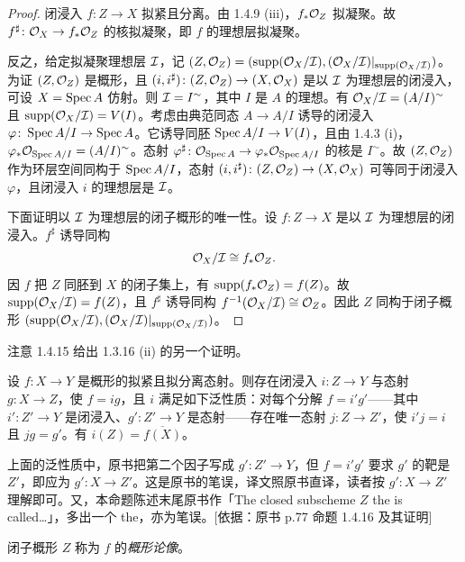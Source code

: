 \begin{proof}
闭浸入 $f\colon Z\to X$ 拟紧且分离。由 1.4.9 (iii)，$f_*\mathcal{O}_Z$ 拟凝聚。故 $f^\sharp\colon\mathcal{O}_X\to f_*\mathcal{O}_Z$ 的核拟凝聚，即 $f$ 的理想层拟凝聚。

反之，给定拟凝聚理想层 $\mathcal{I}$，记 $(Z,\mathcal{O}_Z)=(\operatorname{supp}(\mathcal{O}_X/\mathcal{I}),(\mathcal{O}_X/\mathcal{I})|_{\operatorname{supp}(\mathcal{O}_X/\mathcal{I})})$。为证 $(Z,\mathcal{O}_Z)$ 是概形，且 $(i,i^\sharp)\colon(Z,\mathcal{O}_Z)\to(X,\mathcal{O}_X)$ 是以 $\mathcal{I}$ 为理想层的闭浸入，可设 $X=\operatorname{Spec} A$ 仿射。则 $\mathcal{I}=I^\sim$，其中 $I$ 是 $A$ 的理想。有 $\mathcal{O}_X/\mathcal{I}=(A/I)^\sim$ 且 $\operatorname{supp}(\mathcal{O}_X/\mathcal{I})=V(I)$。考虑由典范同态 $A\to A/I$ 诱导的闭浸入 $\varphi\colon\operatorname{Spec} A/I\to\operatorname{Spec} A$。它诱导同胚 $\operatorname{Spec} A/I\to V(I)$，且由 1.4.3 (i)，$\varphi_*\mathcal{O}_{\operatorname{Spec} A/I}=(A/I)^\sim$。态射 $\varphi^\sharp\colon\mathcal{O}_{\operatorname{Spec} A}\to\varphi_*\mathcal{O}_{\operatorname{Spec} A/I}$ 的核是 $I^\sim$。故 $(Z,\mathcal{O}_Z)$ 作为环层空间同构于 $\operatorname{Spec} A/I$，态射 $(i,i^\sharp)\colon(Z,\mathcal{O}_Z)\to(X,\mathcal{O}_X)$ 可等同于闭浸入 $\varphi$，且闭浸入 $i$ 的理想层是 $\mathcal{I}$。

下面证明以 $\mathcal{I}$ 为理想层的闭子概形的唯一性。设 $f\colon Z\to X$ 是以 $\mathcal{I}$ 为理想层的闭浸入。$f^\sharp$ 诱导同构
\[
\mathcal{O}_X/\mathcal{I}\cong f_*\mathcal{O}_Z.
\]
因 $f$ 把 $Z$ 同胚到 $X$ 的闭子集上，有 $\operatorname{supp}(f_*\mathcal{O}_Z)=f(Z)$。故 $\operatorname{supp}(\mathcal{O}_X/\mathcal{I})=f(Z)$，且 $f^\sharp$ 诱导同构 $f^{-1}(\mathcal{O}_X/\mathcal{I})\cong\mathcal{O}_Z$。因此 $Z$ 同构于闭子概形 $(\operatorname{supp}(\mathcal{O}_X/\mathcal{I}),(\mathcal{O}_X/\mathcal{I})|_{\operatorname{supp}(\mathcal{O}_X/\mathcal{I})})$。
\end{proof}

注意 1.4.15 给出 1.3.16 (ii) 的另一个证明。

\begin{proposition}\label{it:1.4.16}
设 $f\colon X\to Y$ 是概形的拟紧且拟分离态射。则存在闭浸入 $i\colon Z\to Y$ 与态射 $g\colon X\to Z$，使 $f=ig$，且 $i$ 满足如下泛性质：对每个分解 $f=i'g'$——其中 $i'\colon Z'\to Y$ 是闭浸入、$g'\colon Z'\to Y$ 是态射——存在唯一态射 $j\colon Z\to Z'$，使 $i'j=i$ 且 $jg=g'$。有 $i(Z)=\overline{f(X)}$。
\end{proposition}

\begin{tnote}
上面的泛性质中，原书把第二个因子写成 $g'\colon Z'\to Y$，但 $f=i'g'$ 要求 $g'$ 的靶是 $Z'$，即应为 $g'\colon X\to Z'$。这是原书的笔误，译文照原书直译，读者按 $g'\colon X\to Z'$ 理解即可。又，本命题陈述末尾原书作「The closed subscheme $Z$ the is called…」，多出一个 the，亦为笔误。[依据：原书 p.77 命题 1.4.16 及其证明]
\end{tnote}

闭子概形 $Z$ 称为 $f$ 的\emph{概形论像}。

